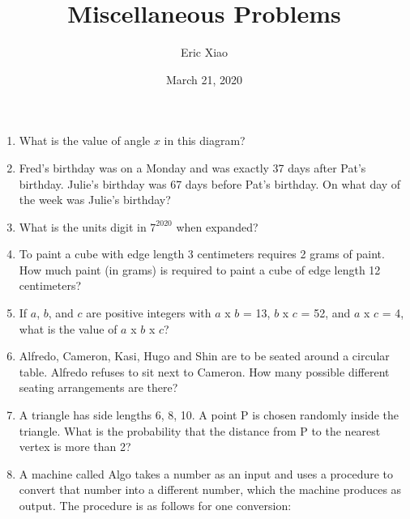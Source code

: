 \documentclass[12pt]{article}
\title{Miscellaneous Problems}
\author{Eric Xiao}
\date{March 21, 2020}
\begin{document}
\maketitle

\begin{enumerate}
    \itemsep3.0em
    \item {What is the value of angle {$x$\textdegree} in this diagram?
    
    }
    
    \item {Fred's birthday was on a Monday and was exactly 37 days after Pat's birthday. Julie's birthday was 67 days before Pat's birthday. On what day of the week was Julie's birthday?}
    
    \item {What is the units digit in $7^{2020}$ when expanded?}
    
    \item {To paint a cube with edge length 3 centimeters requires 2 grams of paint. How much paint (in grams) is required to paint a cube of edge length 12 centimeters?}

    \item {If $a$, $b$, and $c$ are positive integers with $a$ x $b$ = 13, $b$ x $c$ = 52, and $a$ x $c$ = 4, what is the value of $a$ x $b$ x $c$?}
    
    \item {Alfredo, Cameron, Kasi, Hugo and Shin are to be seated around a circular table. Alfredo refuses to sit next to Cameron. How many possible different seating arrangements are there?}
    
    \item {A triangle has side lengths 6, 8, 10. A point P is chosen randomly inside the triangle. What is the probability that the distance from P to the nearest vertex is more than 2?}
    
    \item {A machine called Algo takes a number as an input and uses a procedure to convert that number into a different number, which the machine produces as output. The procedure is as follows for one conversion:
    
}
\end{enumerate}
\end{document}
